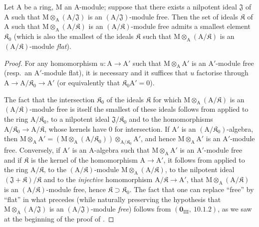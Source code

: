 \begin{corollary}[11.4.4]
\label{IV.11.4.4}
Let $\mathrm{A}$ be a ring, $\mathrm{M}$ an $\mathrm{A}$-module; suppose that there exists
a nilpotent ideal $\mathfrak{J}$ of $\mathrm{A}$ such that $\mathrm{M}\otimes_\mathrm{A}(\mathrm{A}/\mathfrak{J})$ is an $(\mathrm{A}/\mathfrak{J})$-module free. Then the set of
ideals $\mathfrak{K}$ of $\mathrm{A}$ such that $\mathrm{M}\otimes_\mathrm{A}(\mathrm{A}/\mathfrak{K})$ is an $(\mathrm{A}/\mathfrak{K})$-module free admits a smallest element $\mathfrak{K}_0$
(which is also the smallest of the ideals $\mathfrak{K}$ such that $\mathrm{M}\otimes_\mathrm{A}(\mathrm{A}/\mathfrak{K})$ is an $(\mathrm{A}/\mathfrak{K})$-module \emph{flat}).
\end{corollary}

\begin{proof}
For any homomorphism $u:\mathrm{A}\to\mathrm{A}'$ such that $\mathrm{M}\otimes_\mathrm{A}\mathrm{A}'$ is an $\mathrm{A}'$-module free (resp.\ an
$\mathrm{A}'$-module flat), it is necessary and it suffices that $u$ factorise through $\mathrm{A}\to\mathrm{A}/\mathfrak{K}_0\to\mathrm{A}'$ (or equivalently that $\mathfrak{K}_0\mathrm{A}'=0$).

The fact that the intersection $\mathfrak{K}_0$ of the ideals $\mathfrak{K}$ for which $\mathrm{M}\otimes_\mathrm{A}(\mathrm{A}/\mathfrak{K})$ is an
$(\mathrm{A}/\mathfrak{K})$-module free is itself the smallest of these ideals follows from  applied to the
ring $\mathrm{A}/\mathfrak{K}_0$, to a nilpotent ideal $\mathfrak{J}/\mathfrak{K}_0$ and to the homomorphisms $\mathrm{A}/\mathfrak{K}_0\to\mathrm{A}/\mathfrak{K}$,
whose kernels have $0$ for intersection. If $\mathrm{A}'$ is an $(\mathrm{A}/\mathfrak{K}_0)$-algebra, then
$\mathrm{M}\otimes_\mathrm{A}\mathrm{A}'=(\mathrm{M}\otimes_\mathrm{A}(\mathrm{A}/\mathfrak{K}_0))\otimes_{\mathrm{A}/\mathfrak{K}_0}\mathrm{A}'$, and hence $\mathrm{M}\otimes_\mathrm{A}\mathrm{A}'$ is an $\mathrm{A}'$-module free. Conversely, if $\mathrm{A}'$ is an $\mathrm{A}$-algebra such that $\mathrm{M}\otimes_\mathrm{A}\mathrm{A}'$ is an $\mathrm{A}'$-module free and if $\mathfrak{K}$ is the kernel
of the homomorphism $\mathrm{A}\to\mathrm{A}'$, it follows from  applied to the ring $\mathrm{A}/\mathfrak{K}$, to the
$(\mathrm{A}/\mathfrak{K})$-module $\mathrm{M}\otimes_\mathrm{A}(\mathrm{A}/\mathfrak{K})$, to the nilpotent ideal $(\mathfrak{J}+\mathfrak{K})/\mathfrak{K}$ and to the \emph{injective} homomorphism
$\mathrm{A}/\mathfrak{K}\to\mathrm{A}'$, that $\mathrm{M}\otimes_\mathrm{A}(\mathrm{A}/\mathfrak{K})$ is an $(\mathrm{A}/\mathfrak{K})$-module free, hence $\mathfrak{K}\supset\mathfrak{K}_0$. The fact that
one can replace ``free'' by ``flat'' in what precedes (while naturally preserving
the hypothesis that $\mathrm{M}\otimes_\mathrm{A}(\mathrm{A}/\mathfrak{J})$ is an $(\mathrm{A}/\mathfrak{J})$-module \emph{free}) follows from $(\mathbf{0}_{\mathrm{III}},~10.1.2)$,
as we saw at the beginning of the proof of .
\end{proof}

